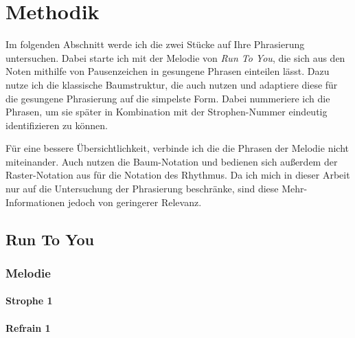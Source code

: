 \chapter{Methodik}
\label{chap:Methodik}
\pagestyle{plain}

Im folgenden Abschnitt werde ich die zwei Stücke auf Ihre Phrasierung untersuchen. Dabei starte ich mit der Melodie von \textit{Run To You}, die sich aus den Noten mithilfe von Pausenzeichen in gesungene Phrasen einteilen lässt. Dazu nutze ich die klassische Baumstruktur, die auch \cite{lerdahl1983generative} nutzen und adaptiere diese für die gesungene Phrasierung auf die simpelste Form. Dabei nummeriere ich die Phrasen, um sie später in Kombination mit der Strophen-Nummer eindeutig identifizieren zu können. 

Für eine bessere Übersichtlichkeit, verbinde ich die die Phrasen der Melodie nicht miteinander. Auch \cite{hayes1996role} nutzen die Baum-Notation und bedienen sich außerdem der Raster-Notation aus \cite{liberman1975intonational} für die Notation des Rhythmus. Da ich mich in dieser Arbeit nur auf die Untersuchung der Phrasierung beschränke, sind diese Mehr-Informationen jedoch von geringerer Relevanz.

\tiny 

\section*{Run To You}

\subsection*{Melodie}

\subsubsection*{Strophe 1}

    
    

\subsubsection*{Refrain 1}

